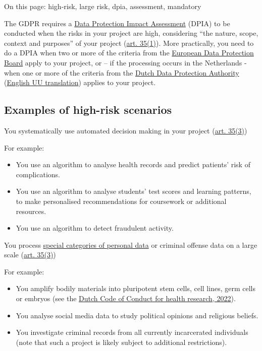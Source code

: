\documentclass[
]{book}
\providecommand{\tightlist}{%
  \setlength{\itemsep}{0pt}\setlength{\parskip}{0pt}}
\begin{document}
On this page: high-risk, large risk, dpia, assessment, mandatory

The GDPR requires a \protect\hyperlink{dpia}{Data Protection Impact Assessment} (DPIA) to be
conducted when the risks in your project are high, considering ``the nature,
scope, context and purposes'' of your project
(\href{https://gdpr-info.eu/art-35-gdpr/}{art. 35(1)}). More
practically, you need to do a DPIA when two or more of the criteria from the
\href{https://ec.europa.eu/newsroom/article29/items/611236}{European Data Protection Board}
apply to your project, or -- if the processing occurs in the Netherlands - when
one or more of the criteria from the
\href{https://www.autoriteitpersoonsgegevens.nl/sites/default/files/atoms/files/stcrt-2019-64418.pdf}{Dutch Data Protection Authority}
(\href{https://intranet.uu.nl/en/system/files/mandatory_dpias_unofficial_translation_of_ap_decision.pdf}{English UU translation})
applies to your project.

\hypertarget{high-risk-examples}{%
\subsection{Examples of high-risk scenarios}\label{high-risk-examples}}

You systematically use automated decision making in your project
(\href{https://gdpr-info.eu/art-35-gdpr/}{art. 35(3)})

For example:

\begin{itemize}
\tightlist
\item
  You use an algorithm to analyse health records and predict patients' risk of
  complications.
\item
  You use an algorithm to analyse students' test scores and learning patterns,
  to make personalised recommendations for coursework or additional resources.
\item
  You use an algorithm to detect fraudulent activity.
\end{itemize}

You process \protect\hyperlink{special-types-personal-data}{special categories of personal data}
or criminal offense data on a large scale
(\href{https://gdpr-info.eu/art-35-gdpr/}{art. 35(3)})

For example:

\begin{itemize}
\tightlist
\item
  You amplify bodily materials into pluripotent stem cells, cell lines, germ
  cells or embryos (see the
  \href{https://www.coreon.org/wp-content/uploads/2022/01/Gedragscode-Gezondheidsonderzoek-2022.pdf\#page=58}{Dutch Code of Conduct for health research, 2022}).
\item
  You analyse social media data to study political opinions and religious
  beliefs.
\item
  You investigate criminal records from all currently incarcerated individuals
  (note that such a project is likely subject to additional restrictions).
\end{itemize}
\end{document}
